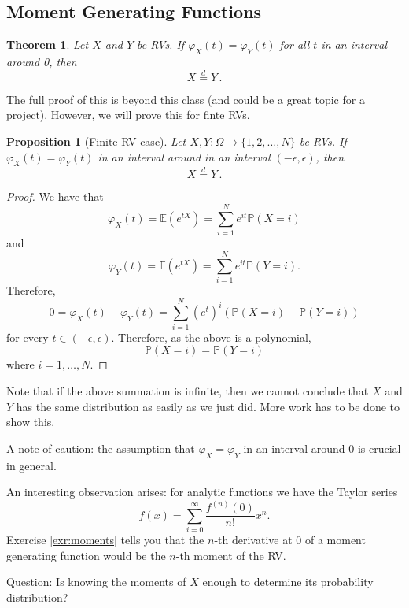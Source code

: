 \documentclass[
  openany]{book}
\newtheorem{theorem}{Theorem}[chapter]
\newtheorem{proposition}{Proposition}[chapter]
\theoremstyle{definition}
\theoremstyle{definition}
\theoremstyle{definition}
\theoremstyle{definition}
\theoremstyle{remark}
\begin{document}
\hypertarget{moment-generating-functions}{%
\subsection{Moment Generating Functions}\label{moment-generating-functions}}

\begin{theorem}
\protect\hypertarget{thm:moment-generating}{}\label{thm:moment-generating}Let \(X\) and \(Y\) be RVs. If \(\varphi_X(t) = \varphi_Y(t)\) for all \(t\) in an interval around 0, then
\[ X  \stackrel{d}{=}Y \,.\]
\end{theorem}

The full proof of this is beyond this class (and could be a great topic for a project).
However, we will prove this for finte RVs.

\begin{proposition}[Finite RV case]
Let \(X,Y: \Omega \to \{1,2, \dots, N\}\) be RVs. If \(\varphi_X(t) = \varphi_Y(t)\) in an interval around in an interval
\((-\epsilon , \epsilon)\), then
\[ X  \stackrel{d}{=}Y \,.\]
\end{proposition}

\begin{proof}
We have that
\[ \varphi_X (t) = \mathbb{E}( e^{tX}) = \sum_{i= 1}^N e^{it}\mathbb{P}( X = i) \]
and
\[ \varphi_Y (t) = \mathbb{E}( e^{tX}) = \sum_{i= 1}^N e^{it}\mathbb{P}( Y = i). \]
Therefore,
\[ 0 = \varphi_X(t) - \varphi_Y(t) = \sum_{i=1}^N (e^t)^i \left( \mathbb{P}(X = i) - \mathbb{P}(Y = i)  \right) \]
for every \(t \in (-\epsilon , \epsilon)\).
Therefore, as the above is a polynomial,
\[ \mathbb{P}( X = i) = \mathbb{P}(Y = i) \]
where \(i = 1, \dots, N\).
\end{proof}

Note that if the above summation is infinite, then we cannot conclude that \(X\) and \(Y\)
has the same distribution as easily as we just did. More work has to be done to show
this.

A note of caution: the assumption that \(\varphi_X = \varphi_Y\) in an interval around \(0\)
is crucial in general.

An interesting observation arises: for analytic functions we have the Taylor series
\[ f(x) = \sum_{i=0}^\infty \frac{f^{(n)}(0)}{n!} x^n. \]
Exercise \ref{exr:moments} tells you that the \(n\)-th derivative at \(0\)
of a moment generating function would be the \(n\)-th moment of the RV.

Question: Is knowing the moments of \(X\) enough to determine its probability distribution?
\end{document}
